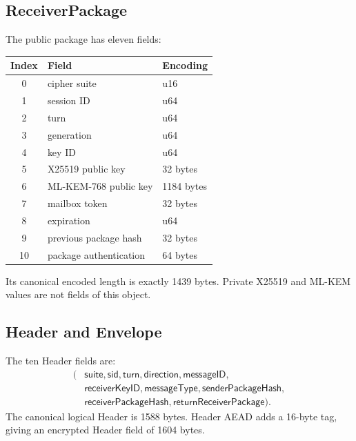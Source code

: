 \documentclass[11pt,letterpaper]{article}
\begin{document}
\subsection{ReceiverPackage}

The public package has eleven fields:
\begin{center}
\begin{tabular}{cll}
\toprule
Index & Field & Encoding \\
\midrule
0 & cipher suite & u16 \\
1 & session ID & u64 \\
2 & turn & u64 \\
3 & generation & u64 \\
4 & key ID & u64 \\
5 & X25519 public key & 32 bytes \\
6 & ML-KEM-768 public key & 1184 bytes \\
7 & mailbox token & 32 bytes \\
8 & expiration & u64 \\
9 & previous package hash & 32 bytes \\
10 & package authentication & 64 bytes \\
\bottomrule
\end{tabular}
\end{center}
Its canonical encoded length is exactly 1439 bytes. Private X25519 and ML-KEM values are
not fields of this object.

\subsection{Header and Envelope}

The ten Header fields are:
\[
  \begin{aligned}
    (&\mathsf{suite},\mathsf{sid},\mathsf{turn},\mathsf{direction},\mathsf{messageID},\\
     &\mathsf{receiverKeyID},\mathsf{messageType},\mathsf{senderPackageHash},\\
     &\mathsf{receiverPackageHash},\mathsf{returnReceiverPackage}).
  \end{aligned}
\]
The canonical logical Header is 1588 bytes. Header AEAD adds a 16-byte tag, giving an
encrypted Header field of 1604 bytes.
\end{document}
